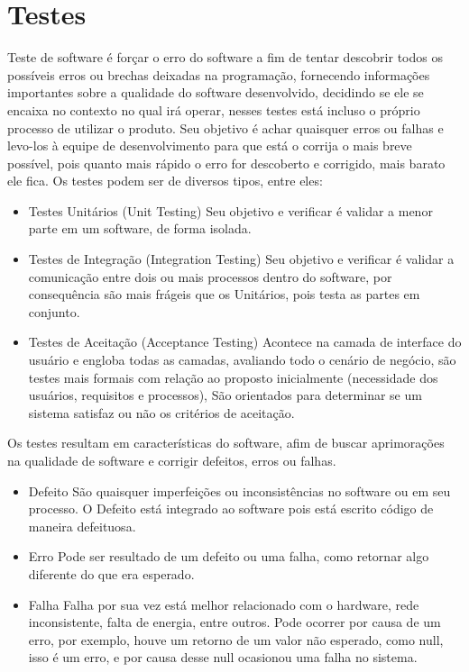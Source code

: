 \documentclass[12pt]{article}
\begin{document}
    \section{Testes}
        Teste de software é forçar o erro do software a fim de tentar descobrir todos os possíveis erros ou brechas deixadas na programação, fornecendo informações importantes sobre a qualidade do software desenvolvido, decidindo se ele se encaixa no contexto no qual irá operar, nesses testes está incluso o próprio processo de utilizar o produto. Seu objetivo é achar quaisquer erros ou falhas e levo-los à equipe de desenvolvimento para que está o corrija o mais breve possível, pois quanto mais rápido o erro for descoberto e corrigido, mais barato ele fica. Os testes podem ser de diversos tipos, entre eles:
        
        \begin{itemize}
            \item Testes Unitários (Unit Testing)
                Seu objetivo e verificar é validar a menor parte em um software, de forma isolada.
            \item Testes de Integração (Integration Testing)
                Seu objetivo e verificar é validar a comunicação entre dois ou mais processos dentro do software, por consequência são mais frágeis que os Unitários, pois testa as partes em conjunto.
            \item Testes de Aceitação (Acceptance Testing)
                Acontece na camada de interface  do usuário e engloba todas as camadas, avaliando todo o cenário de negócio, são testes mais formais com relação ao proposto inicialmente (necessidade dos usuários, requisitos e processos), São orientados para determinar se um sistema satisfaz ou não os critérios de aceitação. 
        \end{itemize}
        Os testes resultam em características do software, afim de buscar aprimorações na qualidade de software e corrigir defeitos, erros ou falhas.
        
        \begin{itemize}
            \item Defeito
                São quaisquer imperfeições ou inconsistências no software ou em seu processo. O Defeito está integrado ao software pois está escrito código de maneira defeituosa.
            \item Erro
                Pode ser resultado de um defeito ou uma falha, como retornar algo diferente do que era esperado.
            \item Falha
                Falha por sua vez está melhor relacionado com o hardware, rede inconsistente, falta de energia, entre outros. Pode ocorrer por causa de um erro, por exemplo, houve um retorno de um valor não esperado, como null, isso é um erro, e por causa desse null ocasionou uma falha no sistema.
        \end{itemize}
    
\end{document}
